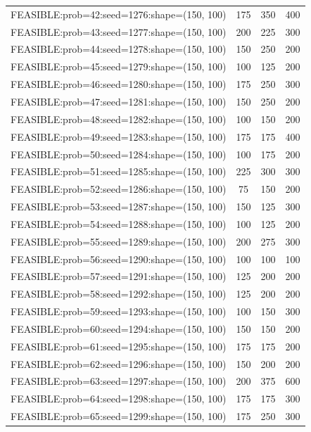\begin{longtable}{lccc}
FEASIBLE:prob=42:seed=1276:shape=(150, 100)  &  175 &   350 &    400 \\
FEASIBLE:prob=43:seed=1277:shape=(150, 100)  &  200 &   225 &    300 \\
FEASIBLE:prob=44:seed=1278:shape=(150, 100)  &  150 &   250 &    200 \\
FEASIBLE:prob=45:seed=1279:shape=(150, 100)  &  100 &   125 &    200 \\
FEASIBLE:prob=46:seed=1280:shape=(150, 100)  &  175 &   250 &    300 \\
FEASIBLE:prob=47:seed=1281:shape=(150, 100)  &  150 &   250 &    200 \\
FEASIBLE:prob=48:seed=1282:shape=(150, 100)  &  100 &   150 &    200 \\
FEASIBLE:prob=49:seed=1283:shape=(150, 100)  &  175 &   175 &    400 \\
FEASIBLE:prob=50:seed=1284:shape=(150, 100)  &  100 &   175 &    200 \\
FEASIBLE:prob=51:seed=1285:shape=(150, 100)  &  225 &   300 &    300 \\
FEASIBLE:prob=52:seed=1286:shape=(150, 100)  &   75 &   150 &    200 \\
FEASIBLE:prob=53:seed=1287:shape=(150, 100)  &  150 &   125 &    300 \\
FEASIBLE:prob=54:seed=1288:shape=(150, 100)  &  100 &   125 &    200 \\
FEASIBLE:prob=55:seed=1289:shape=(150, 100)  &  200 &   275 &    300 \\
FEASIBLE:prob=56:seed=1290:shape=(150, 100)  &  100 &   100 &    100 \\
FEASIBLE:prob=57:seed=1291:shape=(150, 100)  &  125 &   200 &    200 \\
FEASIBLE:prob=58:seed=1292:shape=(150, 100)  &  125 &   200 &    200 \\
FEASIBLE:prob=59:seed=1293:shape=(150, 100)  &  100 &   150 &    300 \\
FEASIBLE:prob=60:seed=1294:shape=(150, 100)  &  150 &   150 &    200 \\
FEASIBLE:prob=61:seed=1295:shape=(150, 100)  &  175 &   175 &    200 \\
FEASIBLE:prob=62:seed=1296:shape=(150, 100)  &  150 &   200 &    200 \\
FEASIBLE:prob=63:seed=1297:shape=(150, 100)  &  200 &   375 &    600 \\
FEASIBLE:prob=64:seed=1298:shape=(150, 100)  &  175 &   175 &    300 \\
FEASIBLE:prob=65:seed=1299:shape=(150, 100)  &  175 &   250 &    300 \\

\end{longtable}
